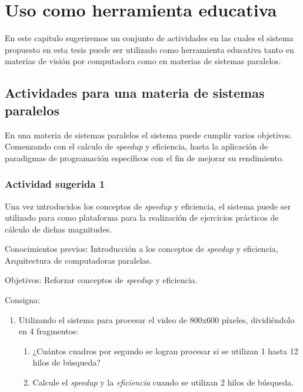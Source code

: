 
\section{Uso como herramienta educativa}

En este capitulo sugeriremos un conjunto de actividades en las cuales el sistema
propuesto en esta tesis puede ser utilizado como herramienta educativa tanto en
materias de visión por computadora como en materias de sistemas paralelos.

\subsection{Actividades para una materia de sistemas paralelos}

En una materia de sistemas paralelos el sistema puede cumplir varios objetivos.
Comenzando con el calculo de \emph{speedup} y eficiencia, hasta la aplicación de
paradigmas de programación específicos con el fin de mejorar su rendimiento.

\subsubsection{Actividad sugerida 1}

Una vez introducidos los conceptos de \emph{speedup} y eficiencia, el sistema
puede ser utilizado para como plataforma para la realización de ejercicios
prácticos de cálculo de dichas magnitudes.

\begin{description}

	\item{Conocimientos previos}: Introducción a los conceptos de
		\emph{speedup} y eficiencia, Arquitectura de computadoras
		paralelas.

	\item{Objetivos}: Reforzar conceptos de \emph{speedup} y eficiencia.

	\item{Consigna}: \begin{enumerate}

	\item{Utilizando el sistema para procesar el video de 800x600 píxeles,
		dividiéndolo en 4 fragmentos:

\begin{enumerate}

	\item{¿Cuántos cuadros por segundo se logran procesar si se utilizan 1
		hasta 12 hilos de búsqueda?}

	\item{Calcule el \emph{speedup} y la \emph{eficiencia} cuando se
		utilizan 2 hilos de búsqueda.}

\end{enumerate}}

\end{enumerate}

\end{description}

